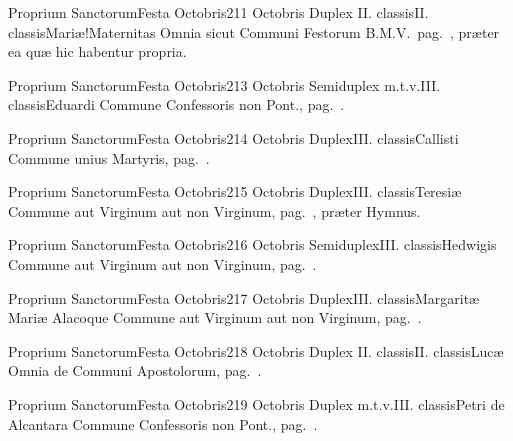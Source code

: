 \documentclass[liber-responsorialis.tex]{subfiles}
\begin{document}
	{Proprium Sanctorum}{Festa Octobris}{2}{11 Octobris}
	{Duplex II. classis}{II. classis}{Mariæ!Maternitas}
	{Omnia sicut Communi Festorum B.M.V.\ pag.\ \pageref{M-CBMV}, præter ea quæ hic habentur propria.}
	{}
\tedeumrubric

	{Proprium Sanctorum}{Festa Octobris}{2}{13 Octobris}
	{Semiduplex m.t.v.}{III. classis}{Eduardi}
	{Commune Confessoris non Pont., pag.\ \pageref{M-CONP}.}
	{}

	{Proprium Sanctorum}{Festa Octobris}{2}{14 Octobris}
	{Duplex}{III. classis}{Callisti}
	{Commune unius Martyris, pag.\ \pageref{M-UMEX}.}
	{}

	{Proprium Sanctorum}{Festa Octobris}{2}{15 Octobris}
	{Duplex}{III. classis}{Teresiæ}
	{Commune aut Virginum aut non Virginum, pag.\ \pageref{M-MU}, præter Hymnus.}
	{}

	{Proprium Sanctorum}{Festa Octobris}{2}{16 Octobris}
	{Semiduplex}{III. classis}{Hedwigis}
	{Commune aut Virginum aut non Virginum, pag.\ \pageref{M-MU}.}
	{}

	{Proprium Sanctorum}{Festa Octobris}{2}{17 Octobris}
	{Duplex}{III. classis}{Margaritæ Mariæ Alacoque}
	{Commune aut Virginum aut non Virginum, pag.\ \pageref{M-MU}.}
	{}

	{Proprium Sanctorum}{Festa Octobris}{2}{18 Octobris}
	{Duplex II. classis}{II. classis}{Lucæ}
	{Omnia de Communi Apostolorum, pag.\ \pageref{M-APEX}.}
	{}

	{Proprium Sanctorum}{Festa Octobris}{2}{19 Octobris}
	{Duplex m.t.v.}{III. classis}{Petri de Alcantara}
	{Commune Confessoris non Pont., pag.\ \pageref{M-CONP}.}
	{}
\end{document}
